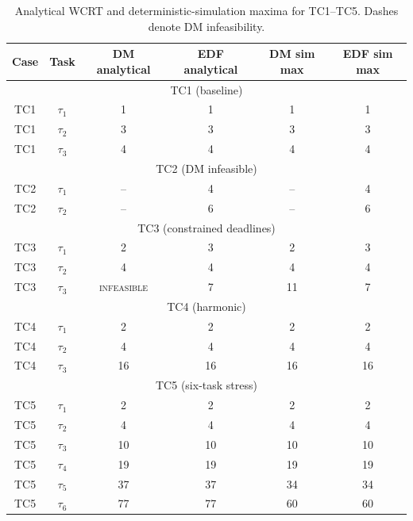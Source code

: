 \documentclass[11pt,a4paper]{article}
\begin{document}
\begin{table}[h]
\centering
\small
\begin{tabular}{|c|c|c|c|c|c|}
\hline
Case & Task & DM analytical & EDF analytical & DM sim max & EDF sim max \\
\hline
\multicolumn{6}{|c|}{TC1 (baseline)} \\
\hline
TC1 & \(\tau_1\) & 1 & 1 & 1 & 1 \\
\hline
TC1 & \(\tau_2\) & 3 & 3 & 3 & 3 \\
\hline
TC1 & \(\tau_3\) & 4 & 4 & 4 & 4 \\
\hline
\multicolumn{6}{|c|}{TC2 (DM infeasible)} \\
\hline
TC2 & \(\tau_1\) & -- & 4 & -- & 4 \\
\hline
TC2 & \(\tau_2\) & -- & 6 & -- & 6 \\
\hline
\multicolumn{6}{|c|}{TC3 (constrained deadlines)} \\
\hline
TC3 & \(\tau_1\) & 2 & 3 & 2 & 3 \\
\hline
TC3 & \(\tau_2\) & 4 & 4 & 4 & 4 \\
\hline
TC3 & \(\tau_3\) & \textsc{infeasible} & 7 & 11 & 7 \\
\hline
\multicolumn{6}{|c|}{TC4 (harmonic)} \\
\hline
TC4 & \(\tau_1\) & 2 & 2 & 2 & 2 \\
\hline
TC4 & \(\tau_2\) & 4 & 4 & 4 & 4 \\
\hline
TC4 & \(\tau_3\) & 16 & 16 & 16 & 16 \\
\hline
\multicolumn{6}{|c|}{TC5 (six-task stress)} \\
\hline
TC5 & \(\tau_1\) & 2 & 2 & 2 & 2 \\
\hline
TC5 & \(\tau_2\) & 4 & 4 & 4 & 4 \\
\hline
TC5 & \(\tau_3\) & 10 & 10 & 10 & 10 \\
\hline
TC5 & \(\tau_4\) & 19 & 19 & 19 & 19 \\
\hline
TC5 & \(\tau_5\) & 37 & 37 & 34 & 34 \\
\hline
TC5 & \(\tau_6\) & 77 & 77 & 60 & 60 \\
\hline
\end{tabular}
\caption{Analytical WCRT and deterministic-simulation maxima for TC1--TC5. Dashes denote DM infeasibility.}
\label{tab:wcrt-comparison}
\end{table}
\end{document}
